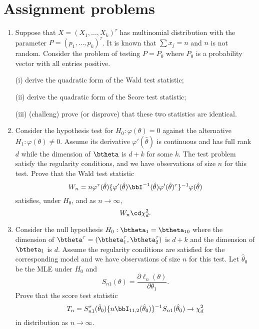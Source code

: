 \section{Assignment problems}
\begin{enumerate}
\item
Suppose that $X = (X_1, \ldots, X_k)^\tau$
has multinomial distribution with the parameter
$P = (p_1, \ldots, p_k)^\tau$. It is known that $ \sum x_j = n $ and $ n $ is not random. 
Consider the problem of testing $P = P_0$ where
$P_0$ is a probability vector with all entries positive. 

(i) derive the quadratic form of the Wald test statistic; 

(ii) derive the quadratic form of the Score test statistic; 

(iii) (challeng) prove (or disprove) that these two statistics are identical.


\item
Consider the hypothesis test for $H_0: \varphi(\theta) = 0$
against the alternative $H_1: \varphi(\theta) \neq 0$.
Assume its derivative $\varphi'(\hat \theta)$ 
is continuous and has full rank $d$ while
the dimension of $\btheta$ is $d+k$ for some $k$.
The test problem satisfy the regularity conditions, and
we have \iid observations of size $n$ for this test.
Prove that the Wald test statistic
\[
W_n =
n \varphi^\tau (\hat \theta) 
\{\varphi'(\hat \theta) \bbI^{-1}(\hat \theta)\varphi'(\hat \theta)^\tau \}^{-1}
\varphi(\hat \theta)
\]
satisfies, under $H_0$, and as $n \to \infty$,
\[
W_n \cd \chi_d^2.
\]

\item
Consider the null hypothesis $H_0: \btheta_1 = \btheta_{10}$
where the dimension of $\btheta^\tau = (\btheta_1^\tau, \btheta_2^\tau)$ is $d+k$
and the dimension of $\btheta_1$ is $d$.
Assume the regularity conditions are satisfied for the corresponding model and
we have \iid observations of size $n$ for this test.
Let $\hat \theta_0$ be the MLE under $H_0$ and
\[
S_{n1}(\theta) = \frac{ \partial \ell_n(\theta)}{\partial \theta_1}.
\]
Prove that the score test statistic
\[
T_n 
= S^\tau_{n1}(\hat \theta_0)\{n \bbI_{11,2}(\hat \theta_0)\}^{-1} S_{n1}(\hat \theta_0)
\to \chi_d^2
\]
in distribution as $n \to \infty$.
\end{enumerate}